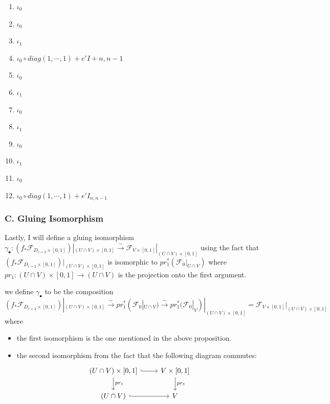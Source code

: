 \begin{enumerate}[label = (\arabic*)]
\item $\iota_0$

\item $\iota_0$

\item $\iota_1$

\item $\iota_0 \circ diag(1,\cdots,1) + e'I+{n,n-1}$

\item $\iota_0$

\item $\iota_1$

\item $\iota_0$

\item $\iota_1$

\item $\iota_0$

\item $\iota_1$

\item $\iota_0$

\item $\iota_0\circ diag(1,\cdots,1) + e'I_{n,n-1}$

\end{enumerate}

\subsubsection{C. Gluing Isomorphism}
Lastly, I will define a gluing isomorphism $\gamma_\bullet : (f_*\mathscr{F}_{D_{r=2}\times [0,1]})|_{(U\cap V)\times [0,1]} \xrightarrow{\sim} \mathscr{F}_{V\times [0,1]}|_{(U\cap V)\times [0,1]}$ using the fact that $(f_*\mathscr{F}_{D_{r=2}\times [0,1]})|_{(U\cap V)\times[0,1]}$ is isomorphic to $pr_1^*(\mathscr{F}_0|_{U\cap V})$ where $pr_1 : (U\cap V) \times [0,1] \rightarrow (U\cap V)$ is the projection onto the first argument.
\begin{definition}
we define $\gamma_\bullet$ to be the composition 
\[
(f_*\mathscr{F}_{D_{r=2}\times [0,1]})|_{(U\cap V)\times [0,1]}\xrightarrow{\sim}pr_1^*(\mathscr{F}_0|_{U\cap V})\xrightarrow{\sim}pr_1^*(\mathscr{F}_0|_{V})|_{(U\cap V)\times [0,1]}=\mathscr{F}_{V\times [0,1]}|_{(U\cap V)\times [0,1]}
\]
where
\begin{itemize}
\item the first isomorphism is the one mentioned in the above proposition.

\item the second isomorphism from the fact that the following diagram commutes:
\[
\begin{tikzcd}
(U\cap V)\times [0,1] \arrow[hookrightarrow]{r}\arrow[d, "pr_1"]     & V\times [0,1] \arrow[d, "pr_1"] \\
(U\cap V) \arrow[hookrightarrow]{r} & V 
\end{tikzcd}
\]
\end{itemize}
\end{definition}

